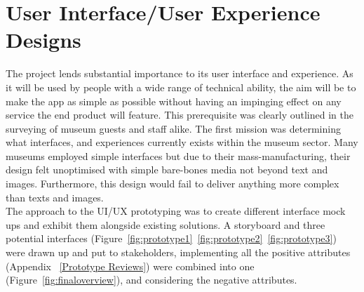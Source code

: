 {\section{User Interface/User Experience Designs}
The project lends substantial importance to its user interface and experience. As it will be used by people with a wide range of technical ability, the aim will be to make the app as simple as possible without having an impinging effect on any service the end product will feature. This prerequisite was clearly outlined in the surveying of museum guests and staff alike. The first mission was determining what interfaces, and experiences currently exists within the museum sector. Many museums employed simple interfaces but due to their mass-manufacturing, their design felt unoptimised with simple bare-bones media not beyond text and images. Furthermore, this design would fail to deliver anything more complex than texts and images.\\
  
The approach to the UI/UX prototyping was to create different interface mock ups and exhibit them alongside existing solutions. A storyboard and three potential interfaces (Figure~\ref{fig:prototype1}~\ref{fig:prototype2}~\ref{fig:prototype3}) were drawn up and put to stakeholders, implementing all the positive attributes (Appendix ~\ref{Prototype Reviews}) were combined into one (Figure~\ref{fig:finaloverview}), and considering the negative attributes.

}